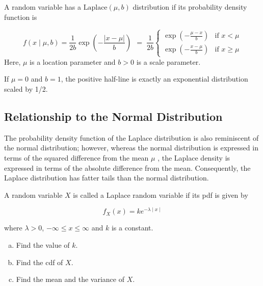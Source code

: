 \documentclass[a4paper,12pt]{article}
\begin{document}
	
	
	\large 
	\noindent A random variable has a ${\displaystyle {\textrm {Laplace}}(\mu ,b)}$ distribution if its probability density function is
	
	\[{\displaystyle f(x\mid \mu ,b)={\frac {1}{2b}}\exp \left(-{\frac {|x-\mu |}{b}}\right)\,\!} \;=\; {\frac  {1}{2b}}\left\{{\begin{matrix}\exp \left(-{\frac  {\mu -x}{b}}\right)&{\text{if }}x<\mu \\[8pt]\exp \left(-{\frac  {x-\mu }{b}}\right)&{\text{if }}x\geq \mu \end{matrix}}\right.\]
	\noindent Here, ${\displaystyle \mu }$  is a location parameter and ${\displaystyle b>0}$ is a scale parameter. 
	
	\medskip
	\noindent If ${\displaystyle \mu =0}$ and ${\displaystyle b=1}$, the positive half-line is exactly an exponential distribution scaled by 1/2.
	
	\subsection*{Relationship to the Normal Distribution}
	The probability density function of the Laplace distribution is also reminiscent of the normal distribution; however, whereas the normal distribution is expressed in terms of the squared difference from the mean ${\displaystyle \mu }$ , the Laplace density is expressed in terms of the absolute difference from the mean. Consequently, the Laplace distribution has fatter tails than the normal distribution.
	
	\newpage
	\large 
	\noindent A random variable $X$ is called a Laplace random variable  if its pdf is given by 
	
	\[f_X(x)=k e^{-\lambda \mid x\mid}\]
	
	w\noindent here $\lambda >0$, $-\infty \leq x \leq \infty$ and $k$ is a constant. 
	
	\begin{enumerate}[(a)]
		\item  Find the value of $k$. 
		\item  Find the cdf of $X$. 
		\item  Find the mean and the variance of $X$. 
	\end{enumerate}
\end{document}
